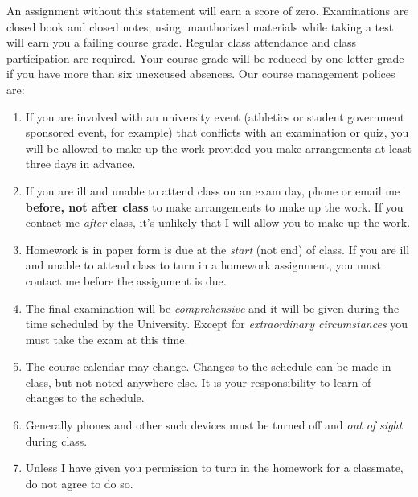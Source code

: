 \documentclass[12pt,fullpage]{article}
\newcounter{ex}\setcounter{ex}{0}
\begin{document}
\begin{quote}
\end{quote}
An assignment without this statement will earn a score of
zero. Examinations are closed book and closed notes; using
unauthorized materials while taking a test will earn you a failing
course grade.  Regular class attendance and class participation are
required. Your course grade will be reduced by one letter grade if
you have more than six unexcused absences. Our course management
polices are:

\begin{enumerate}
      
\item If you are involved with an university event (athletics or student government sponsored event, for example) that
conflicts with an examination or quiz, you will be allowed to make up the  work provided you make arrangements at least three days in
advance.

 
\item If you are ill and unable to attend class on an exam day, phone or email me \textbf{before, not after class} to make
arrangements to make up the work. If you contact me \emph{after} class,
it's unlikely that I will allow you to make up the work.

\item Homework is in paper form is  due at the \emph{start} (not end) of class. If you are ill and  unable to attend class to turn in a homework assignment, you must contact me
before the assignment is due. 



\item The final examination will be \emph{comprehensive} and it will
be given during the time scheduled by the University. Except for \emph{extraordinary circumstances}
you must take the exam at this time.


\item The course calendar may change. Changes to the schedule can be made in class, but not noted anywhere else. It is your responsibility to
learn of changes to the schedule.
 
\item Generally phones and other such devices  must be turned off and \emph{out of sight} during class.

\item Unless I have given you permission to turn in the homework for a classmate, do not agree to do so.



\end{enumerate}
\end{document}
